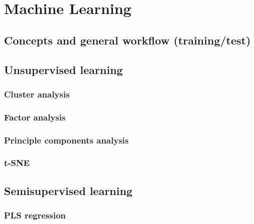\documentclass[
]{book}
\begin{document}
\hypertarget{machine_learning}{%
\chapter{Machine Learning}\label{machine_learning}}

\hypertarget{concepts-and-general-workflow-trainingtest}{%
\section{Concepts and general workflow (training/test)}\label{concepts-and-general-workflow-trainingtest}}

\hypertarget{unsupervised-learning}{%
\section{Unsupervised learning}\label{unsupervised-learning}}

\hypertarget{cluster-analysis}{%
\subsection{Cluster analysis}\label{cluster-analysis}}

\hypertarget{factor-analysis}{%
\subsection{Factor analysis}\label{factor-analysis}}

\hypertarget{principle-components-analysis}{%
\subsection{Principle components analysis}\label{principle-components-analysis}}

\hypertarget{t-sne}{%
\subsection{t-SNE}\label{t-sne}}

\hypertarget{semisupervised-learning}{%
\section{Semisupervised learning}\label{semisupervised-learning}}

\hypertarget{pls-regression}{%
\subsection{PLS regression}\label{pls-regression}}
\end{document}

